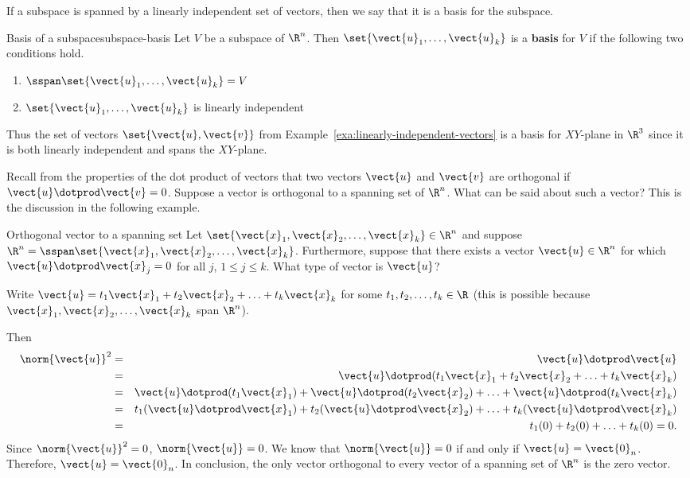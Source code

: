 If a subspace is spanned by a linearly independent set of vectors,
then we say that it is a basis for the subspace.

\begin{definition}{Basis of a subspace}{subspace-basis}
Let $V$ be a subspace of $\R^{n}$. Then $\set{
\vect{u}_{1},\ldots,\vect{u}_{k}} $ is a \textbf{basis} for
$V$ if the following two conditions
hold.

\begin{enumerate}
\item $\sspan\set{\vect{u}_{1},\ldots,\vect{u}_{k}} =V$
\item $\set{\vect{u}_{1},\ldots,\vect{u}_{k}} $ is linearly
independent
\end{enumerate}
\end{definition}

Thus the set of vectors $\set{\vect{u}, \vect{v}}$ from Example~\ref{exa:linearly-independent-vectors} is a basis for $XY$-plane in
$\R^{3}$ since it is both linearly independent and spans
the $XY$-plane.

 Recall from the properties of the dot product of vectors
that two vectors $\vect{u}$ and $\vect{v}$ are orthogonal if $\vect{u}
\dotprod \vect{v} = 0$. Suppose a vector is orthogonal to a spanning set of $\R^n$. What can be said about such a vector? This is the discussion in the following example.

\begin{example}{Orthogonal vector to a spanning set}{}
Let $\set{\vect{x}_1, \vect{x}_2, \ldots, \vect{x}_k}\in\R^n$ and
suppose $\R^n=\sspan\set{\vect{x}_1, \vect{x}_2, \ldots, \vect{x}_k}$.
Furthermore, suppose that there exists a vector $\vect{u}\in\R^n$ for which $\vect{u}\dotprod \vect{x}_j=0$ for all $j$, $1\leq j\leq k$.
What type of vector is $\vect{u}$?
\end{example}

\begin{solution}
Write $\vect{u}=t_1\vect{x}_1 + t_2\vect{x}_2 +\ldots +t_k\vect{x}_k$
for some $t_1, t_2, \ldots, t_k\in\R$
(this is possible because
$\vect{x}_1, \vect{x}_2, \ldots, \vect{x}_k$ span $\R^n$).

Then
\begin{eqnarray*}
\norm{\vect{u}}^2 & = & \vect{u}\dotprod\vect{u} \\
& = & \vect{u}\dotprod(t_1\vect{x}_1 + t_2\vect{x}_2 +\ldots +t_k\vect{x}_k) \\
& = & \vect{u}\dotprod (t_1\vect{x}_1) +  \vect{u}\dotprod (t_2\vect{x}_2) +
\ldots +  \vect{u}\dotprod (t_k\vect{x}_k) \\
& = & t_1(\vect{u}\dotprod \vect{x}_1) + t_2(\vect{u}\dotprod \vect{x}_2) + \ldots
+ t_k(\vect{u}\dotprod \vect{x}_k) \\
& = & t_1(0) + t_2(0) + \ldots + t_k(0) = 0.
\end{eqnarray*}
Since $\norm{\vect{u}}^2 =0$, $\norm{\vect{u}} =0$.
We know that $\norm{\vect{u}}=0$ if and only if
$\vect{u}=\vect{0}_n$.
Therefore, $\vect{u}=\vect{0}_n$.
In conclusion, the only vector orthogonal to every vector of
a spanning set of $\R^n$ is the zero vector.
\end{solution}

